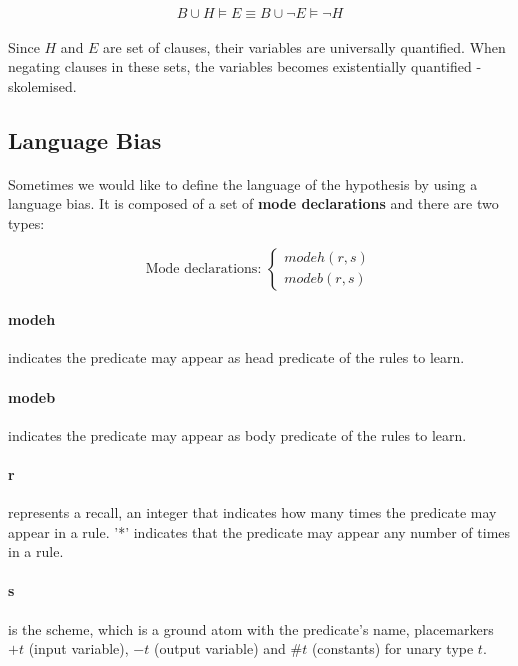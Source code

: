 \documentclass{article}
\theoremstyle{plain}
\theoremstyle{definition}
\begin{document}
\begin{multicols}{2}
\[ B \cup H \models E \equiv B \cup \lnot E \models \lnot H \]

\paragraph{} Since $H$ and $E$ are set of clauses, their variables are universally quantified. When negating clauses in these sets, the variables becomes existentially quantified - skolemised. 

\subsection{Language Bias}\label{sec:LanguageBias}

\paragraph{} Sometimes we would like to define the language of the hypothesis by using a language bias. It is composed of a set of \textbf{mode declarations} and there are two types:

\[
\text{Mode declarations: }
\begin{cases}
	modeh(r, s)\\
	modeb(r, s)
\end{cases}
\]

\paragraph{modeh} indicates the predicate may appear as head predicate of the rules to learn.
\paragraph{modeb} indicates the predicate may appear as body predicate of the rules to learn.
\paragraph{r} represents a recall, an integer that indicates how many times the predicate may appear in a rule. '*' indicates that the predicate may appear any number of times in a rule.
\paragraph{s} is the scheme, which is a ground atom with the predicate's name, placemarkers $+t$ (input variable), $-t$ (output variable) and $\#t$ (constants) for unary type $t$. 


\end{multicols}
\end{document}
